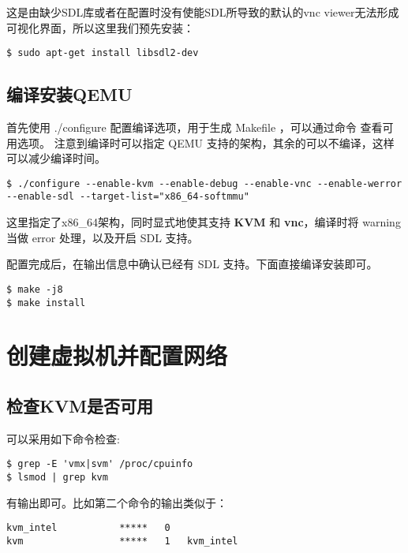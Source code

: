 \documentclass[UTF8,12pt]{ctexart}
\numberwithin{equation}{section}
\begin{document}
这是由缺少SDL库或者在配置时没有使能SDL所导致的默认的vnc viewer无法形成可视化界面，所以这里我们预先安装：
\begin{lstlisting}
$ sudo apt-get install libsdl2-dev
\end{lstlisting}
\subsection{编译安装QEMU}
首先使用 ./configure 配置编译选项，用于生成 Makefile ，可以通过命令 \textbf{\color[RGB]{100,100,235}{./configure --help}} 查看可用选项。
注意到编译时可以指定 QEMU 支持的架构，其余的可以不编译，这样可以减少编译时间。
\begin{lstlisting}[breaklines=true]
$ ./configure --enable-kvm --enable-debug --enable-vnc --enable-werror --enable-sdl --target-list="x86_64-softmmu"
\end{lstlisting}
这里指定了x86\_64架构，同时显式地使其支持 \textbf{KVM} 和 \textbf{vnc}，编译时将 warning 当做 error 处理，以及开启 SDL 支持。

配置完成后，在输出信息中确认已经有 SDL 支持。下面直接编译安装即可。
\begin{lstlisting}
$ make -j8
$ make install
\end{lstlisting}
\section{创建虚拟机并配置网络}
\subsection{检查KVM是否可用}
可以采用如下命令检查:
\begin{lstlisting}
$ grep -E 'vmx|svm' /proc/cpuinfo
$ lsmod | grep kvm
\end{lstlisting}
有输出即可。比如第二个命令的输出类似于：
\begin{lstlisting}
kvm_intel           *****   0
kvm                 *****   1   kvm_intel
\end{lstlisting}
\end{document}
